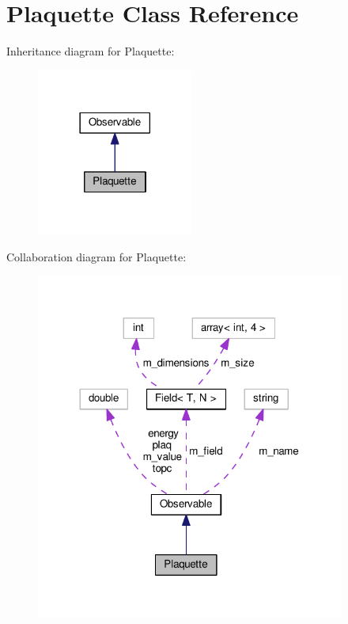 \hypertarget{classPlaquette}{}\section{Plaquette Class Reference}
\label{classPlaquette}


Inheritance diagram for Plaquette\+:\nopagebreak
\begin{figure}[H]
\begin{center}
\leavevmode
\includegraphics[width=146pt]{classPlaquette__inherit__graph}
\end{center}
\end{figure}


Collaboration diagram for Plaquette\+:\nopagebreak
\begin{figure}[H]
\begin{center}
\leavevmode
\includegraphics[width=288pt]{classPlaquette__coll__graph}
\end{center}
\end{figure}
